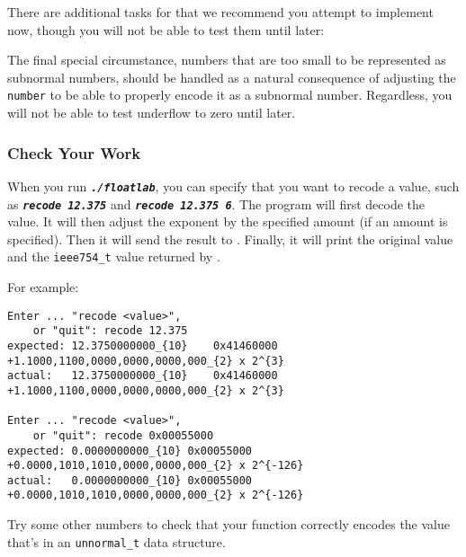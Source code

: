 There are additional tasks for  that we recommend you attempt to implement now, though you will not be able to test them until later:

\begin{description}
\end{description}

The final special circumstance, numbers that are too small to be represented as subnormal numbers,
should be handled as a natural consequence of adjusting the \lstinline{number} to be able to properly encode it as a subnormal number.
Regardless, you will not be able to test underflow to zero until later.


\subsubsection*{Check Your Work}

When you run \texttt{\textbf{\textit{./floatlab}}}, you can specify that you want to recode a value, such as \texttt{\textbf{\textit{recode 12.375}}} and \texttt{\textbf{\textit{recode 12.375 6}}}.
The program will first decode the value.
It will then adjust the exponent by the specified amount (if an amount is specified).
Then it will send the result to .
Finally, it will print the original value and the \lstinline{ieee754_t} value returned by .

\begin{description}
\end{description}
For example:

\begin{verbatim}
Enter ... "recode <value>",
    or "quit": recode 12.375
expected: 12.3750000000_{10}	0x41460000	+1.1000,1100,0000,0000,0000,000_{2} x 2^{3}
actual:   12.3750000000_{10}	0x41460000	+1.1000,1100,0000,0000,0000,000_{2} x 2^{3}

Enter ... "recode <value>",
    or "quit": recode 0x00055000
expected: 0.0000000000_{10}	0x00055000	+0.0000,1010,1010,0000,0000,000_{2} x 2^{-126}
actual:   0.0000000000_{10}	0x00055000	+0.0000,1010,1010,0000,0000,000_{2} x 2^{-126}
\end{verbatim}

Try some other numbers to check that your  function correctly encodes the value that's in an \lstinline{unnormal_t} data structure.
